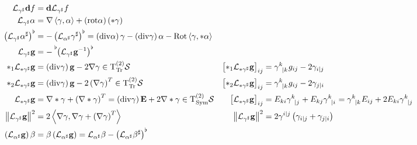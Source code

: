 \documentclass[a4paper,10pt]{scrartcl}
\newcommand{\surf}{\mathcal{S}}
\newcommand{\T}{\mathrm{T}}
\newcommand{\tpsprop}[2]{\T^{(#1)}_{#2}\surf}
\newcommand{\ttssym}{\tpsprop{2}{\mathrm{Sym}}}
\newcommand{\ttstrfree}{\tpsprop{2}{\mathrm{Tr}}}
\newcommand{\exd}{\mathbf{d}}
\newcommand{\rot}{\mathrm{rot}}
\renewcommand{\div}{\mathrm{div}}
\newcommand{\Rot}{\mathrm{Rot}}
\newcommand{\lie}{\mathcal{L}}
\newcommand{\gb}{\mathbf{g}}
\newcommand{\Eb}{\mathbf{E}}
\begin{document}
  \begin{align*}
    \lie_{\gamma^{\sharp}}\exd f &= \exd\lie_{\gamma^{\sharp}}f\\
    \lie_{\gamma^{\sharp}}\alpha &= \nabla\left\langle \gamma, \alpha \right\rangle + \left( \rot\alpha \right)\left( *\gamma \right)\\
    \left( \lie_{\gamma^{\sharp}}\alpha^{\sharp} \right)^{\flat}
             &= -\left( \lie_{\alpha^{\sharp}}\gamma^{\sharp} \right)^{\flat}
              = \left( \div\alpha \right)\gamma - \left( \div\gamma \right)\alpha - \Rot\left\langle \gamma, *\alpha \right\rangle\\
    \lie_{\gamma^{\sharp}}\gb &= -\tensor[^{\flat}]{\left( \lie_{\gamma^{\sharp}}\gb^{-1} \right)}{^{\flat}} \\
    *_{1}\lie_{*\gamma^{\sharp}}\gb &= \left(\div\gamma\right)\gb - 2\nabla\gamma \in \ttstrfree
              &\left[ *_{1}\lie_{*\gamma^{\sharp}}\gb \right]_{ij} &= \tensor{\gamma}{^{k}_{|k}}g_{ij} - 2\gamma_{i|j}\\
    *_{2}\lie_{*\gamma^{\sharp}}\gb &= \left(\div\gamma\right)\gb - 2\left(\nabla\gamma\right)^{T} \in \ttstrfree
              &\left[ *_{2}\lie_{*\gamma^{\sharp}}\gb \right]_{ij} &= \tensor{\gamma}{^{k}_{|k}}g_{ij} - 2\gamma_{j|i}\\
    \lie_{*\gamma^{\sharp}}\gb &=\nabla * \gamma + \left( \nabla * \gamma \right)^{T} = \left(\div\gamma\right)\Eb + 2\nabla * \gamma \in \ttssym
              &\left[ \lie_{*\gamma^{\sharp}}\gb \right]_{ij} 
                    &=  E_{ki}\tensor{\gamma}{^{k}_{|j}} + E_{kj}\tensor{\gamma}{^{k}_{|i}}
                     =  \tensor{\gamma}{^{k}_{|k}}E_{ij} + 2 E_{ki}\tensor{\gamma}{^{k}_{|j}}\\
    \left\| \lie_{\gamma^{\sharp}}\gb \right\|^{2} &= 2\left\langle \nabla\gamma , \nabla\gamma+\left( \nabla\gamma \right)^{T} \right\rangle
              & \left\| \lie_{\gamma^{\sharp}}\gb \right\|^{2} &= 2\gamma^{i|j}\left( \gamma_{i|j} + \gamma_{j|i} \right)\\
    \left( \lie_{\alpha^{\sharp}}\gb \right)\beta &= \beta \left( \lie_{\alpha^{\sharp}}\gb \right)
                = \lie_{\alpha^{\sharp}}\beta - \left( \lie_{\alpha^{\sharp}}\beta^{\sharp} \right)^{\flat}
  \end{align*}
\end{document}
